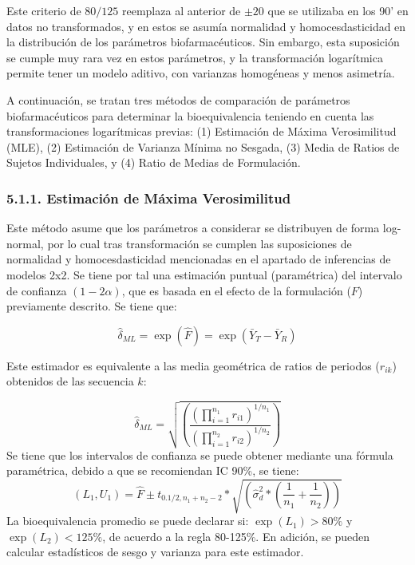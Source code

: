 \documentclass[]{article}
\begin{document}
Este criterio de \(80/125\) reemplaza al anterior de \(\pm 20\) que se
utilizaba en los 90' en datos no transformados, y en estos se asumía
normalidad y homocesdasticidad en la distribución de los parámetros
biofarmacéuticos. Sin embargo, esta suposición se cumple muy rara vez en
estos parámetros, y la transformación logarítmica permite tener un
modelo aditivo, con varianzas homogéneas y menos asimetría.

A continuación, se tratan tres métodos de comparación de parámetros
biofarmacéuticos para determinar la bioequivalencia teniendo en cuenta
las transformaciones logarítmicas previas: (1) Estimación de Máxima
Verosimilitud (MLE), (2) Estimación de Varianza Mínima no Sesgada, (3)
Media de Ratios de Sujetos Individuales, y (4) Ratio de Medias de
Formulación.

\subsubsection{5.1.1. Estimación de Máxima
Verosimilitud}\label{estimacion-de-maxima-verosimilitud}

Este método asume que los parámetros a considerar se distribuyen de
forma log-normal, por lo cual tras transformación se cumplen las
suposiciones de normalidad y homocesdasticidad mencionadas en el
apartado de inferencias de modelos 2x2. Se tiene por tal una estimación
puntual (paramétrica) del intervalo de confianza \((1-2\alpha)\), que es
basada en el efecto de la formulación (\(F\)) previamente descrito. Se
tiene que:

\[\hat{\delta}_{ML} = \exp(\hat{F}) = \exp(\bar{Y}_{T}-\bar{Y}_{R})\]

Este estimador es equivalente a las media geométrica de ratios de
periodos (\(r_{ik}\)) obtenidos de las secuencia \(k\):

\[
\hat{\delta}_{ML} = \sqrt{\left(\frac{\left(\prod_{i = 1}^{n_{1}}{r_{i1}}\right)^{1/n_{1}}}{\left(\prod_{i = 1}^{n_{2}}{r_{i2}}\right )^{1/n_{2}}}\right)}
\] Se tiene que los intervalos de confianza se puede obtener mediante
una fórmula paramétrica, debido a que se recomiendan IC 90\%, se
tiene:\\
\[
(L_{1}, U_{1}) = \hat{F} \pm t_{0.1/2, n_{1}+n_{2}-2}*\sqrt{\left(\hat{\sigma}_{d}^2*\left(\frac{1}{n_{1}}+\frac{1}{n_{2}}\right)\right)}
\] La bioequivalencia promedio se puede declarar si:
\(\exp{(L_{1})}>80\%\) y \(\exp{(L_{2})}<125\%\), de acuerdo a la regla
80-125\%. En adición, se pueden calcular estadísticos de sesgo y
varianza para este estimador.
\end{document}
